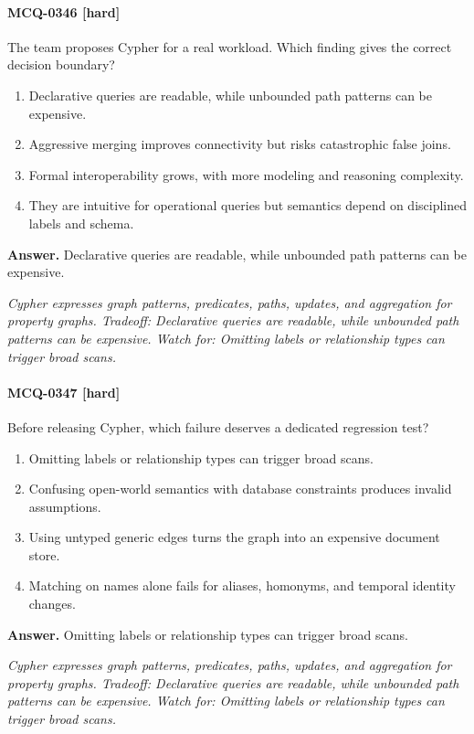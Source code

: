 \paragraph{MCQ-0346 [hard]} The team proposes Cypher for a real workload. Which finding gives the correct decision boundary?
\begin{enumerate}[label=\Alph*.]
\item Declarative queries are readable, while unbounded path patterns can be expensive.
\item Aggressive merging improves connectivity but risks catastrophic false joins.
\item Formal interoperability grows, with more modeling and reasoning complexity.
\item They are intuitive for operational queries but semantics depend on disciplined labels and schema.
\end{enumerate}
\noindent\textbf{Answer.} Declarative queries are readable, while unbounded path patterns can be expensive.
\par\textit{Cypher expresses graph patterns, predicates, paths, updates, and aggregation for property graphs. Tradeoff: Declarative queries are readable, while unbounded path patterns can be expensive. Watch for: Omitting labels or relationship types can trigger broad scans.}
\paragraph{MCQ-0347 [hard]} Before releasing Cypher, which failure deserves a dedicated regression test?
\begin{enumerate}[label=\Alph*.]
\item Omitting labels or relationship types can trigger broad scans.
\item Confusing open-world semantics with database constraints produces invalid assumptions.
\item Using untyped generic edges turns the graph into an expensive document store.
\item Matching on names alone fails for aliases, homonyms, and temporal identity changes.
\end{enumerate}
\noindent\textbf{Answer.} Omitting labels or relationship types can trigger broad scans.
\par\textit{Cypher expresses graph patterns, predicates, paths, updates, and aggregation for property graphs. Tradeoff: Declarative queries are readable, while unbounded path patterns can be expensive. Watch for: Omitting labels or relationship types can trigger broad scans.}

